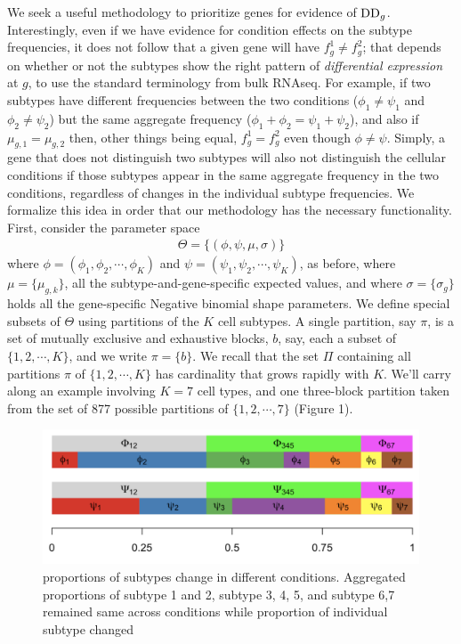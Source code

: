 \documentclass[11pt]{amsart}
\begin{document}
We seek a useful methodology to prioritize genes for evidence
of ${\rm DD}_g$.  Interestingly, even if we have evidence for condition effects
on the subtype frequencies, it does not follow that a given
gene will have $f^1_g \neq f^2_g$; that depends on whether or not the subtypes
show the right pattern of {\em differential expression} at $g$, to use the 
standard terminology from bulk RNAseq.  For example, if two subtypes have 
different frequencies between the two conditions ($\phi_1 \neq \psi_1$ and 
 $\phi_2 \neq \psi_2$) but the same aggregate frequency
($\phi_1+\phi_2 = \psi_1 + \psi_2$),  and also  if $\mu_{g,1} = \mu_{g,2}$
then, other things being equal, $f^1_g = f^2_g$ even though $\phi \neq \psi$.
Simply, a gene that does not distinguish two subtypes will also not distinguish
the cellular conditions if those subtypes appear in the same aggregate frequency
in the two conditions, regardless of changes in the individual subtype 
frequencies. We formalize this idea in order that our methodology
has the necessary functionality.  First, consider the parameter space 
\begin{eqnarray*}
\Theta = \{ (\phi, \psi,\mu, \sigma)  \}
\end{eqnarray*}
where $\phi=(\phi_1, \phi_2, \cdots, \phi_K)$ and $\psi=(\psi_1, \psi_2, \cdots, \psi_K)$,
as before, where $\mu = \{ \mu_{g,k} \}$, all the subtype-and-gene-specific expected
values, and where $\sigma = \{ \sigma_g \}$ holds all the gene-specific Negative binomial
shape parameters.  We define special subsets of $\Theta$ using
partitions of the $K$ cell subtypes.  A single partition, say $\pi$, is a set of
mutually exclusive and exhaustive blocks, $b$, say, each a subset of $\{1, 2, 
\cdots, K\}$, and we write $\pi = \{ b \}$.  We recall 
that the set $\Pi$ containing all partitions $\pi$ of $\{1,2, \cdots, K\}$
has cardinality that grows rapidly with $K$. 
 We'll carry along an example
involving $K=7$ cell types, and one three-block partition taken
from the set of 877 possible partitions of $\{1, 2, \cdots, 7\}$ (Figure 1).
\begin{figure}[h!]
  \includegraphics[height = 4cm, width=\linewidth]{prop.png}
  \caption{proportions of subtypes change in different conditions. Aggregated proportions of subtype 1 and 2, subtype 3, 4, 5, and subtype 6,7 remained same across conditions while proportion of individual subtype changed}
  \label{fig:1}
\end{figure}
\end{document}

